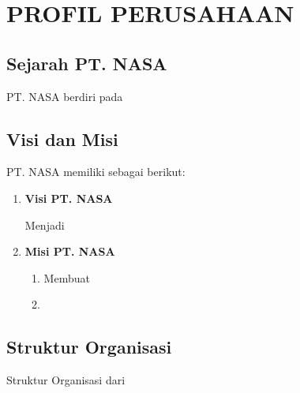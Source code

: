 \chapter{PROFIL PERUSAHAAN}


\section{Sejarah PT. NASA}

PT. NASA berdiri pada \lipsum[11]

\lipsum[12][1-10]

\section{Visi dan Misi}

PT. NASA memiliki \lipsum[13][1-3] sebagai berikut:

\begin{enumerate}[nolistsep]

  \item \textbf{Visi PT. NASA}

  Menjadi \lipsum[13][4-7]

  \item \textbf{Misi PT. NASA}

  \begin{enumerate}[nolistsep]

    \item Membuat \lipsum[13][8-9]

    \item \lipsum[13][10-12]

  \end{enumerate}

\end{enumerate}

\section{Struktur Organisasi}

Struktur Organisasi dari \lipsum[14][1-8]

